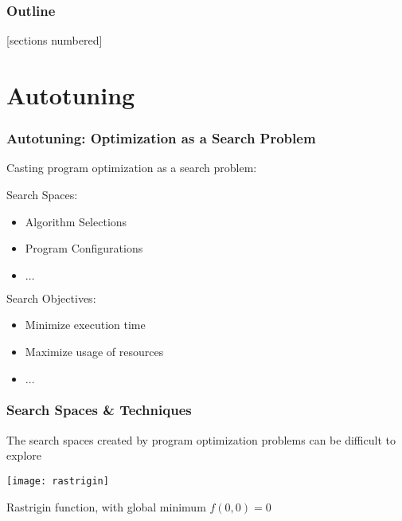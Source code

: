 \documentclass[10pt, compress, aspectratio=169, xcolor=table]{beamer}
\begin{document}
\begin{frame}
    \frametitle{Outline}
    [sections numbered]
    \tableofcontents[hideallsubsections]
\end{frame}

\section{Autotuning}

\begin{frame}
    \frametitle{Autotuning: Optimization as a Search Problem}
    Casting program optimization as a \alert{search problem}:

    \alert{Search Spaces}:
    \begin{itemize}
        \item Algorithm Selections
        \item Program Configurations
        \item $\dots$
    \end{itemize}

    \alert{Search Objectives}:
    \begin{itemize}
        \item Minimize \alert{execution time}
        \item Maximize \alert{usage of resources}
        \item $\dots$
    \end{itemize}
\end{frame}

\begin{frame}
    \frametitle{Search Spaces \& Techniques}
    The \alert{search spaces} created by program optimization problems can be
    \alert{difficult to explore}

    \begin{center}
        \texttt{[image: rastrigin]}

        Rastrigin function, with \alert{global minimum} $f(0,0) = 0$
    \end{center}
\end{frame}
\end{document}
